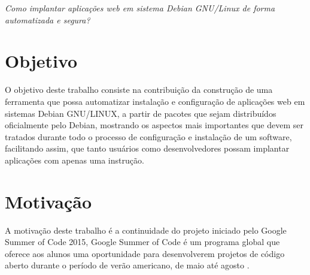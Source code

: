 \begin{center}
  \textit{
  Como implantar aplicações web em sistema Debian GNU/Linux de forma automatizada
  e segura?
}
\end{center}

\section{Objetivo}

O objetivo deste trabalho consiste na contribuição da construção de uma ferramenta
que possa automatizar instalação e configuração de aplicações web em sistemas
Debian GNU/LINUX, a partir de pacotes que sejam distribuídos oficialmente pelo
Debian, mostrando os aspectos mais importantes que devem ser tratados durante
todo o processo de configuração e instalação de um software, facilitando assim, que
tanto usuários como desenvolvedores possam implantar aplicações com apenas uma
instrução.

%


\section{Motivação}
\label{sec:motivacao}
A motivação deste trabalho é a continuidade do projeto iniciado pelo Google Summer
of Code 2015, Google Summer of Code é um programa global que oferece aos
alunos uma oportunidade para desenvolverem projetos de código aberto durante o período
de verão americano, de maio até agosto \cite{gsoc2015}.

